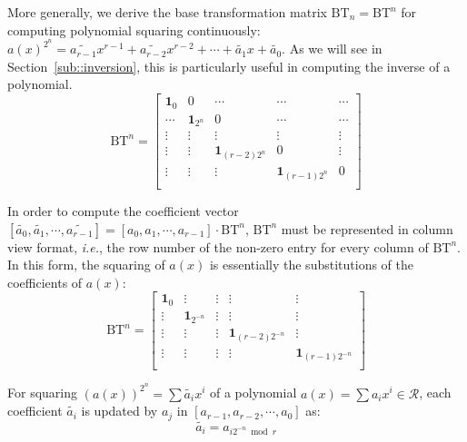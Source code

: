 \documentclass[runningheads]{llncs}
\begin{document}
%
More generally, we derive the base transformation matrix $\text{BT}_n=\text{BT}^n$ for
computing polynomial squaring continuously:
$a(x)^{2^n}=\widetilde{a_{r-1}}x^{r-1}+\widetilde{a_{r-2}}x^{r-2}+\cdots + \widetilde{a_{1}}x +\widetilde{a_0}$.
As we will see in Section~\ref{sub::inversion},
this is particularly useful in computing the
inverse of a polynomial.
\[
\text{BT}^n =
\left[ \begin{array}{ccccc}
\mathbf{1}_{0}&0&\cdots&\cdots&\cdots  \\
\cdots&\mathbf{1}_{2^n}&0 &\cdots&\cdots \\
\vdots&\vdots&\vdots&\vdots&\vdots\\
\vdots&\vdots&\mathbf{1}_{(r-2)2^n}&0&\vdots\\
\vdots&\vdots&\vdots&\mathbf{1}_{(r-1)2^n}&0\\
\end{array}
\right ]
\]

In order to compute the coefficient vector $[\widetilde{a_{0}},\widetilde{a_{1}},\cdots,\widetilde{a_{r-1}}]=[{a_{0}},{a_{1}},\cdots,{a_{r-1}}]
\cdot \text{BT}^n$, $\text{BT}^n$ must be represented in column view format, \textit{i.e.},
the row number of the non-zero entry for every column of $\text{BT}^n$. In this form, the squaring of $a(x)$ is essentially the substitutions of the coefficients of $a(x)$:
\[
\text{BT}^n =
\left[ \begin{array}{ccccc}
\mathbf{1}_{0}&\vdots& \vdots&\vdots&\vdots \\
\vdots&\mathbf{1}_{2^{-n}}&\vdots&\vdots&\vdots\\
\vdots&\vdots&\vdots&\mathbf{1}_{(r-2)2^{-n}}&\vdots\\
\vdots&\vdots&\vdots&\vdots&\mathbf{1}_{(r-1)2^{-n}}\\
\end{array}
\right ]
\]

\begin{theorem}
For squaring $(a(x))^{2^n}=\sum\widetilde{a_{i}}x^i$ of a polynomial $a(x)=\sum a_ix^i \in \mathcal{R}$, each coefficient $\widetilde{a_{i}}$ is updated by $a_{j}$ in $[{a_{r-1}},{a_{r-2}},\cdots,{a_0}]$ as:
\[
    \widetilde{a_{i}} = a_{i2^{-n}\bmod r}
\]
\end{theorem}
\end{document}
